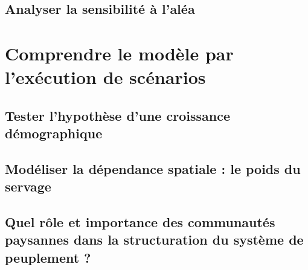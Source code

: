 \subsection{Analyser la sensibilité à l'aléa}

\section{Comprendre le modèle par l'exécution de scénarios}
\subsection{Tester l'hypothèse d'une croissance démographique}
\subsection{Modéliser la dépendance spatiale : le poids du servage}
\subsection{Quel rôle et importance des communautés paysannes dans la structuration du système de peuplement ?}